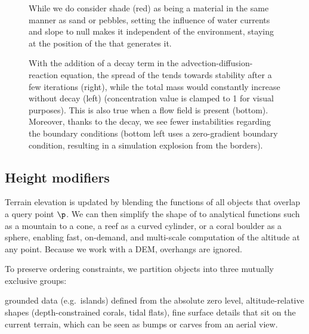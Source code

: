 \begin{figure}
\caption{While we do consider shade (red) as being a material in the same manner as sand or pebbles, setting the influence of water currents and slope to null makes it independent of the environment, staying at the position of the  that generates it.}
\label{fig:env-obj-shade}
\end{figure}

\begin{figure}[H]
\centering
{}
\caption{With the addition of a decay term in the advection-diffusion-reaction equation, the spread of the  tends towards stability after a few iterations (right), while the total mass would constantly increase without decay (left) (concentration value is clamped to 1 for visual purposes). This is also true when a flow field is present (bottom). Moreover, thanks to the decay, we see fewer instabilities regarding the boundary conditions (bottom left uses a zero-gradient boundary condition, resulting in a simulation explosion from the borders).}
\label{fig:env-obj-stability-examples}
\end{figure}

\subsection{Height modifiers}

Terrain elevation is updated by blending the  functions of all objects that overlap a query point $\p$. We can then simplify the shape of  to analytical functions such as a mountain to a cone, a reef as a curved cylinder, or a coral boulder as a sphere, enabling fast, on-demand, and multi-scale computation of the altitude at any point. Because we work with a DEM, overhangs are ignored.

To preserve ordering constraints, we partition objects into three mutually exclusive groups:
\begin{Itemize}
\Item{$\groundedHeight$} grounded data (e.g.\ islands) defined from the absolute zero level,
\Item{$\altitudeHeight$} altitude-relative shapes (depth-constrained corals, tidal flats),
\Item{$\surfaceHeight$} fine surface details that sit on the current terrain, which can be seen as bumps or carves from an aerial view.
\end{Itemize}

